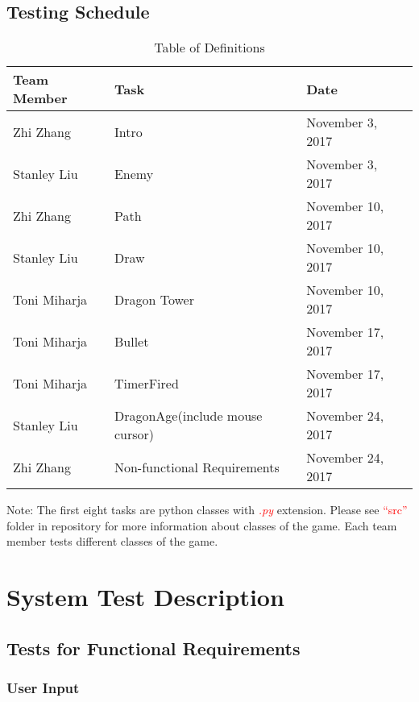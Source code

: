 \documentclass[12,english]{article}
\begin{document}
\subsection{Testing Schedule}
\begin{table}[h!]
    \centering
    \begin{tabular}{|p{3cm}|p{3cm}|p{3cm}|}
    \hline
    \textbf {Team Member} & {Task} & {Date}\\
    \hline
    Zhi Zhang & Intro & November 3, 2017\\
    \hline
    Stanley Liu & Enemy & November 3, 2017\\
    \hline
    Zhi Zhang & Path & November 10, 2017\\
    \hline
    Stanley Liu & Draw & November 10, 2017\\
    \hline
    Toni Miharja & Dragon Tower & November 10, 2017\\
    \hline
    Toni Miharja & Bullet & November 17, 2017\\
    \hline
    Toni Miharja & TimerFired & November 17, 2017\\
    \hline
    Stanley Liu & DragonAge(include mouse cursor) & November 24, 2017\\
    \hline
    Zhi Zhang & Non-functional Requirements & November 24, 2017\\
    \hline
    \end{tabular}
    \caption{Table of Definitions}
\end{table}

Note: The first eight tasks are python classes with \textcolor{red}{\textit{.py}} extension. Please see \textcolor{red}{``src''} folder in repository for more information about classes of the game. Each team member tests different classes of the game.

\section{System Test Description}
\subsection{Tests for Functional Requirements}
\subsubsection{User Input}
\end{document}

